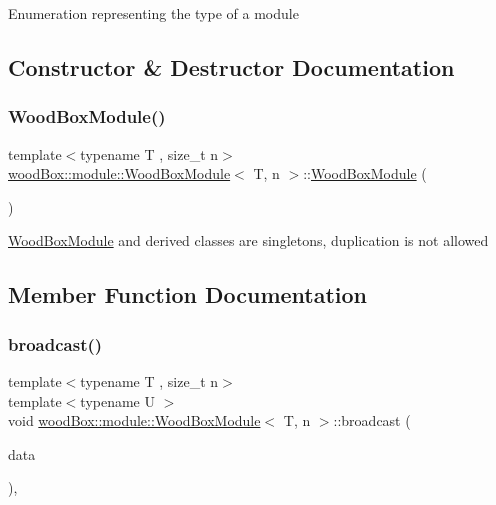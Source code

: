 Enumeration representing the type of a module 

\subsection{Constructor \& Destructor Documentation}
\mbox{\label{classwood_box_1_1module_1_1_wood_box_module_ade3d82ff1e508da2ad37185c208f9333}} 
\subsubsection{\texorpdfstring{Wood\+Box\+Module()}{WoodBoxModule()}}
{\footnotesize\ttfamily template$<$typename T , size\+\_\+t n$>$ \\
\mbox{\hyperlink{classwood_box_1_1module_1_1_wood_box_module}{wood\+Box\+::module\+::\+Wood\+Box\+Module}}$<$ T, n $>$\+::\mbox{\hyperlink{classwood_box_1_1module_1_1_wood_box_module}{Wood\+Box\+Module}} (\begin{DoxyParamCaption}\item[{const \mbox{\hyperlink{classwood_box_1_1module_1_1_wood_box_module}{Wood\+Box\+Module}}$<$ T, n $>$ \&}]{ }\end{DoxyParamCaption})\hspace{0.3cm}{\ttfamily [delete]}}

\mbox{\hyperlink{classwood_box_1_1module_1_1_wood_box_module}{Wood\+Box\+Module}} and derived classes are singletons, duplication is not allowed 

\subsection{Member Function Documentation}
\mbox{\label{classwood_box_1_1module_1_1_wood_box_module_ac481cbb3ee83f192218a5943c59d74fe}} 
\subsubsection{\texorpdfstring{broadcast()}{broadcast()}}
{\footnotesize\ttfamily template$<$typename T , size\+\_\+t n$>$ \\
template$<$typename U $>$ \\
void \mbox{\hyperlink{classwood_box_1_1module_1_1_wood_box_module}{wood\+Box\+::module\+::\+Wood\+Box\+Module}}$<$ T, n $>$\+::broadcast (\begin{DoxyParamCaption}\item[{const U \&}]{data }\end{DoxyParamCaption})\hspace{0.3cm}{\ttfamily [inline]}, {\ttfamily [protected]}}

